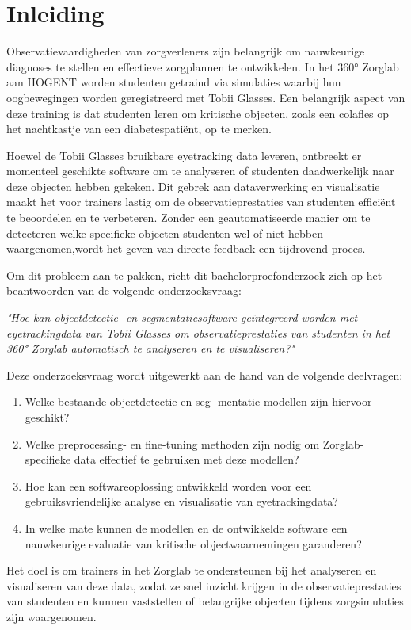
\section{Inleiding}%
\label{sec:inleiding}

Observatievaardigheden van zorgverleners\newline
zijn belangrijk om nauwkeurige diagnoses te stellen
en effectieve zorgplannen te ontwikkelen.
In het 360° Zorglab aan HOGENT worden studenten getraind via simulaties waarbij
hun oogbewegingen worden geregistreerd met Tobii Glasses.
Een belangrijk aspect van deze training is dat studenten leren om kritische objecten,
zoals een colafles op het nachtkastje van een diabetespatiënt, op te merken. 
\par
Hoewel de Tobii Glasses bruikbare eyetracking data leveren, ontbreekt er momenteel geschikte software om te analyseren of studenten daadwerkelijk naar deze objecten hebben gekeken.
Dit gebrek aan dataverwerking en visualisatie maakt het voor trainers lastig om de observatieprestaties van studenten efficiënt te beoordelen en te verbeteren. 
Zonder een geautomatiseerde manier om te detecteren welke specifieke objecten studenten wel of niet hebben waargenomen,\newline wordt het geven van directe feedback een tijdrovend proces.
\par
Om dit probleem aan te pakken, richt dit bachelorproefonderzoek zich op het beantwoorden van de volgende onderzoeksvraag:

\textit{"Hoe kan objectdetectie- en segmentatiesoftware geïntegreerd worden met eyetrackingdata van Tobii Glasses om observatieprestaties van studenten in het 360° Zorglab automatisch te analyseren en te visualiseren?"}

Deze onderzoeksvraag wordt uitgewerkt aan de hand van de volgende deelvragen:
\begin{enumerate}
    \item Welke bestaande objectdetectie en seg- \newline mentatie modellen zijn hiervoor geschikt?
    \item Welke preprocessing- en fine-tuning \newline methoden zijn nodig om Zorglab-specifieke data effectief te gebruiken met deze modellen?
    \item Hoe kan een softwareoplossing ontwikkeld worden voor een gebruiksvriendelijke analyse en visualisatie van eyetrackingdata?
    \item In welke mate kunnen de modellen en de ontwikkelde software een nauwkeurige evaluatie van kritische objectwaarnemingen \newline garanderen?
\end{enumerate}
\par
Het doel is om trainers in het Zorglab te ondersteunen bij het analyseren en visualiseren van deze data, zodat ze snel inzicht krijgen in de observatieprestaties van studenten en kunnen vaststellen of belangrijke objecten tijdens zorgsimulaties zijn waargenomen.

